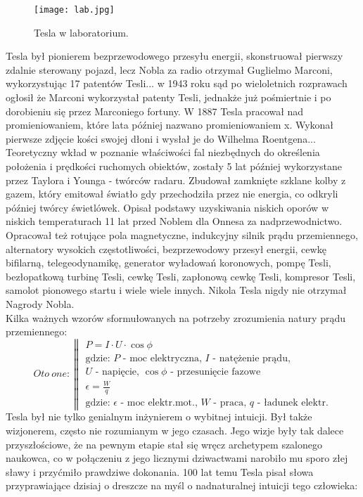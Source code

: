 \documentclass{article}
\begin{document}
\begin{large}
\begin{figure}
\vspace{-10pt}
\texttt{[image: lab.jpg]}
\vspace{0pt}
\caption{Tesla w laboratorium.}
\vspace{0pt}
\end{figure}

Tesla był pionierem bezprzewodowego przesyłu energii, skonstruował pierwszy zdalnie sterowany pojazd, lecz Nobla za radio otrzymał Guglielmo Marconi\cite{art:6}, wykorzystując 17 patentów Tesli... w 1943 roku sąd po wieloletnich rozprawach ogłosił że Marconi wykorzystał patenty Tesli, jednakże już pośmiertnie i po dorobieniu się przez Marconiego fortuny. W 1887 Tesla pracował nad promieniowaniem, które lata później nazwano promieniowaniem x. Wykonał pierwsze zdjęcie kości swojej dłoni i wysłał je do Wilhelma Roentgena... Teoretyczny wkład w poznanie właściwości fal niezbędnych do określenia położenia i prędkości ruchomych obiektów, zostały 5 lat później wykorzystane przez Taylora i Younga - twórców radaru. Zbudował zamknięte szklane kolby z gazem, który emitował światło gdy przechodziła przez nie energia, co odkryli później twórcy świetlówek. Opisał podstawy uzyskiwania niskich oporów w niskich temperaturach 11 lat przed Noblem dla Onnesa za nadprzewodnictwo.
\cite{art:4}
\indent Opracował też rotujące pola magnetyczne, indukcyjny silnik prądu przemiennego, alternatory wysokich częstotliwości, bezprzewodowy przesył energii, cewkę bifilarną, telegeodynamikę, generator wyładowań koronowych, pompę Tesli, bezłopatkową turbinę Tesli, cewkę Tesli, zapłonową cewkę Tesli, kompresor Tesli, samolot pionowego startu i wiele wiele innych.
Nikola Tesla nigdy nie otrzymał Nagrody Nobla.
\\
Kilka ważnych wzorów sformułowanych na potrzeby zrozumienia natury prądu przemiennego:
\\
$$
Oto\ one : \left\| \begin{array}{l}
P = I \cdot U \cdot \cos{\phi}\\
\textrm{gdzie: $P$ - moc elektryczna, $I$ - natężenie prądu,}\\
\textrm{$U$ - napięcie, $\cos{\phi}$ - przesunięcie fazowe}\\
\epsilon = \frac{W}{q}\\
\textrm{gdzie: $\epsilon$ - moc elektr.mot., $W$ - praca, $q$ - ładunek elektr.}
\end{array} \right.
$$
\cite{art:5}
\indent Tesla był nie tylko genialnym inżynierem o wybitnej intuicji. Był także wizjonerem, często nie rozumianym w jego czasach. Jego wizje były tak dalece przyszłościowe, że na pewnym etapie stał się wręcz archetypem szalonego naukowca, co w połączeniu z jego licznymi dziwactwami narobiło mu sporo złej sławy i przyćmiło prawdziwe dokonania. 100 lat temu Tesla pisał słowa przyprawiające dzisiaj o dreszcze na myśl o nadnaturalnej intuicji tego człowieka:


\end{large}
\end{document}
